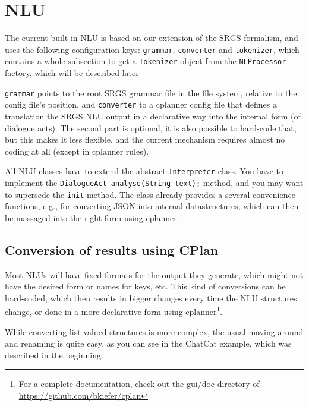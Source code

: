 \section{NLU}
The current built-in NLU is based on our extension of the SRGS
formalism, and uses the following configuration keys:
\texttt{grammar}, \texttt{converter} and \texttt{tokenizer}, which
contains a whole subsection to get a \texttt{Tokenizer} object from
the \texttt{NLProcessor} factory, which will be described later

\texttt{grammar} points to the root SRGS grammar file in the file
system, relative to the config file's position, and \texttt{converter}
to a cplanner config file that defines a translation the SRGS NLU output
in a declarative way into the internal form (of dialogue acts). The
second part is optional, it is also possible to hard-code that, but
this makes it less flexible, and the current mechanism requires almost
no coding at all (except in cplanner rules).

All NLU classes have to extend the abstract \texttt{Interpreter}
class. You have to implement the
\verb|DialogueAct analyse(String text);| method, and you may want to
supersede the \texttt{init} method. The class already provides a
several convenience functions, e.g., for converting JSON into internal
datastructures, which can then be massaged into the right form using cplanner.

\subsection{Conversion of results using CPlan}

Most NLUs will have fixed formats for the output they generate, which
might not have the desired form or names for keys, etc. This kind of
conversions can be hard-coded, which then results in bigger changes
every time the NLU structures change, or done in a more declarative
form using cplanner\footnote{For a complete documentation, check out
  the gui/doc directory of \url{https://github.com/bkiefer/cplan}}.

While converting list-valued structures is more complex, the usual
moving around and renaming is quite easy, as you can see in the
ChatCat example, which was described in the beginning.


